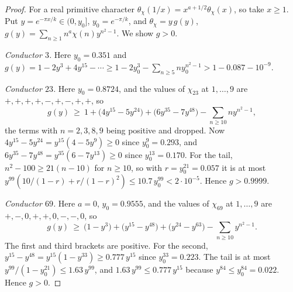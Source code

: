 \begin{proof}
For a real primitive character $\theta_\chi(1/x)=x^{a+1/2}\theta_\chi(x)$, so take $x\ge1$. Put $y=e^{-\pi x/k}\in(0,y_0]$, $y_0=e^{-\pi/k}$, and $\theta_\chi=y\,g(y)$, $g(y)=\sum_{n\ge1}n^a\chi(n)y^{n^2-1}$. We show $g>0$.

\emph{Conductor $3$.} Here $y_0=0.351$ and $g(y)=1-2y^3+4y^{15}-\cdots\ge1-2y_0^3-\sum_{n\ge5}ny_0^{n^2-1}>1-0.087-10^{-9}$.

\emph{Conductor $23$.} Here $y_0=0.8724$, and the values of $\chi_{23}$ at $1,\dots,9$ are $+,+,+,+,\allowbreak-,+,-,\allowbreak+,+$, so
\[
g(y)\ \ge\ 1+\bigl(4y^{15}-5y^{24}\bigr)+\bigl(6y^{35}-7y^{48}\bigr)-\sum_{n\ge10}ny^{n^2-1},
\]
the terms with $n=2,3,8,9$ being positive and dropped. Now $4y^{15}-5y^{24}=y^{15}(4-5y^9)\ge0$ since $y_0^9=0.293$, and $6y^{35}-7y^{48}=y^{35}(6-7y^{13})\ge0$ since $y_0^{13}=0.170$. For the tail, $n^2-100\ge21(n-10)$ for $n\ge10$, so with $r=y_0^{21}=0.057$ it is at most $y^{99}(10/(1-r)+r/(1-r)^2)\le10.7\,y_0^{99}<2\cdot10^{-5}$. Hence $g>0.9999$.

\emph{Conductor $69$.} Here $a=0$, $y_0=0.9555$, and the values of $\chi_{69}$ at $1,\dots,9$ are $+,-,0,+,+,0,-,-,0$, so
\[
g(y)\ \ge\ \bigl(1-y^3\bigr)+\bigl(y^{15}-y^{48}\bigr)+\bigl(y^{24}-y^{63}\bigr)-\sum_{n\ge10}y^{n^2-1}.
\]
The first and third brackets are positive. For the second, $y^{15}-y^{48}=y^{15}(1-y^{33})\ge0.777\,y^{15}$ since $y_0^{33}=0.223$. The tail is at most $y^{99}/(1-y_0^{21})\le1.63\,y^{99}$, and $1.63\,y^{99}\le0.777\,y^{15}$ because $y^{84}\le y_0^{84}=0.022$. Hence $g>0$.
\end{proof}

